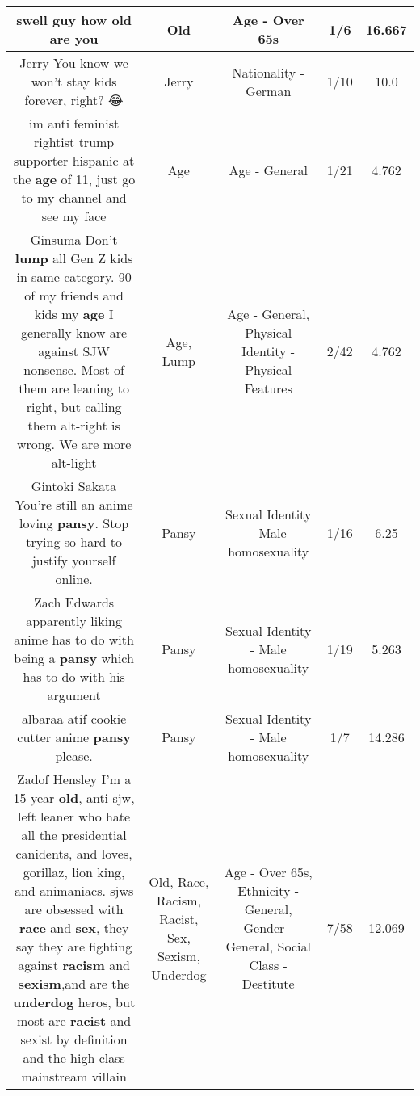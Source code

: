 \documentclass[11pt]{article}
\newlength\mylength
\begin{document}
\begin{center}
\begin{longtable}{|C{.65\mylength}|C{.30\mylength}|C{.12\mylength}|C{.12\mylength}|C{.12\mylength}|}
  \small swell guy how \textbf{old} are you\normalsize   & Old & Age - Over 65s & 1/6 & 16.667 \\  \hline
  \small Jerry You know we won't stay kids forever, right? 😂\normalsize   & Jerry & Nationality - German & 1/10 & 10.0 \\  \hline
  \small im anti feminist rightist trump supporter hispanic at the \textbf{age} of 11, just go to my channel and see my face\normalsize   & Age & Age - General & 1/21 & 4.762 \\  \hline
  \small Ginsuma Don't \textbf{lump} all Gen Z kids in same category. 90 of my friends and kids my \textbf{age} I generally know are against SJW nonsense. Most of them are leaning to right, but calling them alt-right is wrong. We are more alt-light\normalsize   & Age, Lump & Age - General, Physical Identity - Physical Features & 2/42 & 4.762 \\  \hline
  \small Gintoki Sakata You're still an anime loving \textbf{pansy}. Stop trying so hard to justify yourself online.\normalsize   & Pansy & Sexual Identity - Male homosexuality & 1/16 & 6.25 \\  \hline
  \small Zach Edwards apparently liking anime has to do with being a \textbf{pansy} which has to do with his argument\normalsize   & Pansy & Sexual Identity - Male homosexuality & 1/19 & 5.263 \\  \hline
  \small albaraa atif cookie cutter anime \textbf{pansy} please.\normalsize   & Pansy & Sexual Identity - Male homosexuality & 1/7 & 14.286 \\  \hline
  \small Zadof Hensley I'm a 15 year \textbf{old}, anti sjw, left leaner who hate all the presidential canidents, and loves, gorillaz, lion king, and animaniacs. sjws are obsessed with \textbf{race} and \textbf{sex}, they say they are fighting against \textbf{racism} and \textbf{sexism},and are the \textbf{underdog} heros, but most are \textbf{racist} and sexist by definition and the high class mainstream villain\normalsize   & Old, Race, Racism, Racist, Sex, Sexism, Underdog & Age - Over 65s, Ethnicity - General, Gender - General, Social Class - Destitute & 7/58 & 12.069 \\  \hline

\end{longtable}
\end{center}
\end{document}
